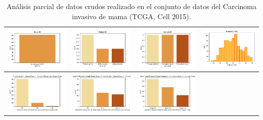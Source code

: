 \newpage
\begin{table}[!h]
\begin{center} 
	\caption{Análisis parcial de datos crudos realizado en el conjunto de datos del Carcinoma invasivo de mama (TCGA, Cell 2015).}
	\label{datos_crudos}
	\begin{tabular}{ |c|c|c|c| }
		\hline 
		  \includegraphics[width=.22\textwidth]{NOTEBOOK/IMAGENES_CRUDAS/1} 
		& \includegraphics[width=.25\textwidth]{NOTEBOOK/IMAGENES_CRUDAS/2} 
		& \includegraphics[width=.25\textwidth]{NOTEBOOK/IMAGENES_CRUDAS/3}
		& \includegraphics[width=.25\textwidth]{NOTEBOOK/IMAGENES_CRUDAS/4} 
		\\  \hline 
		  \includegraphics[width=.25\textwidth]{NOTEBOOK/IMAGENES_CRUDAS/5} 
		& \includegraphics[width=.25\textwidth]{NOTEBOOK/IMAGENES_CRUDAS/6} 
		& \includegraphics[width=.25\textwidth]{NOTEBOOK/IMAGENES_CRUDAS/7} 

\end{tabular}
\end{center}
\end{table}
